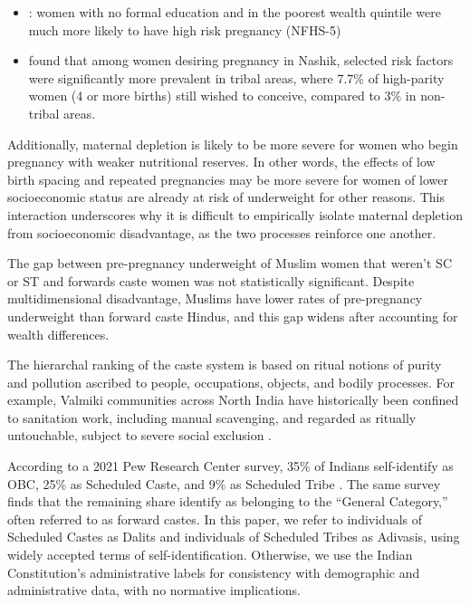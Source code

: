 \begin{itemize}
    \item \cite{kuppusamy2023high}: women with no formal education and in the poorest wealth quintile were much more likely to have high risk pregnancy (NFHS-5)

    \item \cite{doke2022prevalence} found that among women desiring pregnancy in Nashik, selected risk factors were significantly more prevalent in tribal areas, where 7.7\% of high-parity women (4 or more births) still wished to conceive, compared to 3\% in non-tribal areas.
    
\end{itemize}
Additionally, maternal depletion is likely to be more severe for women who begin pregnancy with weaker nutritional reserves. In other words, the effects of low birth spacing and repeated pregnancies may be more severe for women of lower socioeconomic status are already at risk of underweight for other reasons. This interaction underscores why it is difficult to empirically isolate maternal depletion from socioeconomic disadvantage, as the two processes reinforce one another.

The gap between pre-pregnancy underweight of Muslim women that weren't SC or ST and forwards caste women was not statistically significant. Despite multidimensional disadvantage, Muslims have lower rates of pre-pregnancy underweight than forward caste Hindus, and this gap widens after accounting for wealth differences.


The hierarchal ranking of the caste system is based on ritual notions of purity and pollution ascribed to people, occupations, objects, and bodily processes. For example, Valmiki communities across North India have historically been confined to sanitation work, including manual scavenging, and regarded as ritually untouchable, subject to severe social exclusion \citep{valmiki2008joothan}. 



According to a 2021 Pew Research Center survey, 35\% of Indians self-identify as OBC, 25\% as Scheduled Caste, and 9\% as Scheduled Tribe \citep{starr2021measuring}. The same survey finds that the remaining share identify as belonging to the “General Category,” often referred to as forward castes. In this paper, we refer to individuals of Scheduled Castes as Dalits and individuals of Scheduled Tribes as Adivasis, using widely accepted terms of self-identification. Otherwise, we use the Indian Constitution’s administrative labels for consistency with demographic and administrative data, with no normative implications.


